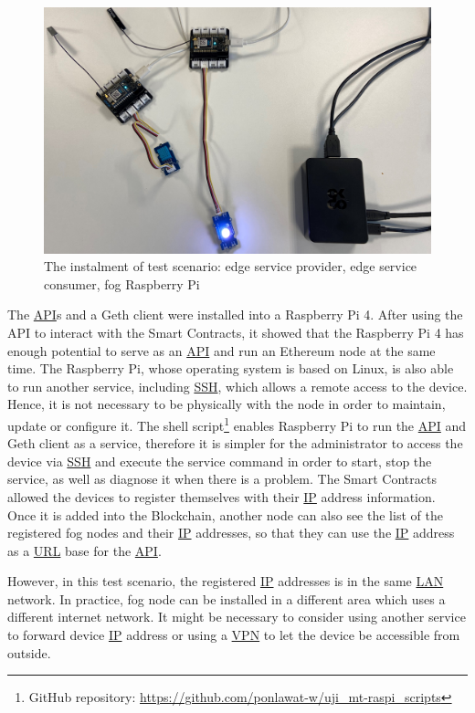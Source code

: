 \begin{figure}[hbt!]
  \centering
  \includegraphics[width=\textwidth]{images/ScenarioBlue.jpg}
  \caption{The instalment of test scenario: edge service provider, edge service consumer, fog Raspberry Pi}
  \label{fig:ScenarioBlue}
\end{figure}

\npara The \hyperref[Acronym-API]{API}s and a Geth client were installed into a Raspberry Pi 4.
After using the API to interact with the Smart Contracts, it showed that the Raspberry Pi 4 has enough potential to serve as an \hyperref[Acronym-API]{API} and run an Ethereum node at the same time.
The Raspberry Pi, whose operating system is based on Linux, is also able to run another service, including \hyperref[Acronym-SSH]{SSH}, which allows a remote access to the device.
Hence, it is not necessary to be physically with the node in order to maintain, update or configure it.
The shell script\footnote{GitHub repository: \url{https://github.com/ponlawat-w/uji_mt-raspi_scripts}} enables Raspberry Pi to run the \hyperref[Acronym-API]{API} and Geth client as a service, therefore it is simpler for the administrator to access the device via \hyperref[Acronym-SSH]{SSH} and execute the service command in order to start, stop the service, as well as diagnose it when there is a problem.
The Smart Contracts allowed the devices to register themselves with their \hyperref[Acronym-IP]{IP} address information.
Once it is added into the Blockchain, another node can also see the list of the registered fog nodes and their \hyperref[Acronym-IP]{IP} addresses, so that they can use the \hyperref[Acronym-IP]{IP} address as a \hyperref[Acronym-URL]{URL} base for the \hyperref[Acronym-API]{API}.

\npara However, in this test scenario, the registered \hyperref[Acronym-IP]{IP} addresses is in the same \hyperref[Acronym-LAN]{LAN} network.
In practice, fog node can be installed in a different area which uses a different internet network.
It might be necessary to consider using another service to forward device \hyperref[Acronym-IP]{IP} address or using a \hyperref[Acronym-VPN]{VPN} to let the device be accessible from outside.

